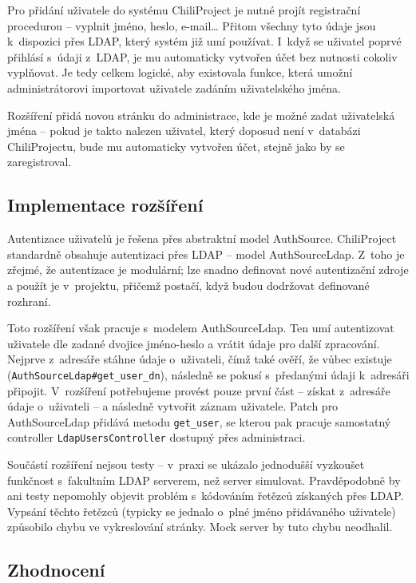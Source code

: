 \documentclass[thesis=B,czech]{FITthesis}[2012/05/02]
\begin{document}
Pro přidání uživatele do systému ChiliProject je nutné projít
registrační procedurou -- vyplnit jméno, heslo, e-mail\ldots{} Přitom
všechny tyto údaje jsou k~dispozici přes \gls{LDAP}, který systém již
umí používat. I~když se uživatel poprvé přihlásí s~údaji z~\gls{LDAP},
je mu automaticky vytvořen účet bez nutnosti cokoliv vyplňovat. Je tedy
celkem logické, aby existovala funkce, která umožní administrátorovi
importovat uživatele zadáním uživatelského jména.

Rozšíření přidá novou stránku do administrace, kde je možné zadat
uživatelská jména -- pokud je takto nalezen uživatel, který doposud není
v~databázi ChiliProjectu, bude mu automaticky vytvořen účet, stejně jako
by se zaregistroval.

\subsection{Implementace rozšíření}

Autentizace uživatelů je řešena přes abstraktní model AuthSource.
ChiliProject standardně obsahuje autentizaci přes \gls{LDAP} -- model
AuthSourceLdap. Z~toho je zřejmé, že autentizace je modulární; lze
snadno definovat nové autentizační zdroje a použít je v~projektu, přičemž
postačí, když budou dodržovat definované rozhraní.

Toto rozšíření však pracuje s~modelem AuthSourceLdap. Ten umí
autentizovat uživatele dle zadané dvojice jméno-heslo a vrátit údaje pro
další zpracování. Nejprve z~adresáře stáhne údaje o~uživateli, čímž
také ověří, že vůbec existuje
(\lstinline!AuthSourceLdap#get_user_dn!), následně se pokusí s~předanými
údaji k~adresáři připojit. V~rozšíření potřebujeme provést pouze první
část -- získat z~adresáře údaje o~uživateli -- a následně vytvořit
záznam uživatele. Patch pro AuthSourceLdap přidává metodu
\lstinline!get_user!, se kterou pak pracuje samostatný controller
\lstinline!LdapUsersController! dostupný přes administraci.

Součástí rozšíření nejsou testy -- v~praxi se ukázalo jednodušší
vyzkoušet funkčnost s~fakultním LDAP serverem, než server simulovat.
Pravděpodobně by ani testy nepomohly objevit problém s~kódováním řetězců
získaných přes LDAP. Vypsání těchto řetězců (typicky se jednalo o~plné
jméno přidávaného uživatele) způsobilo chybu ve vykreslování stránky.
Mock server by tuto chybu neodhalil.

\subsection{Zhodnocení}
\end{document}
